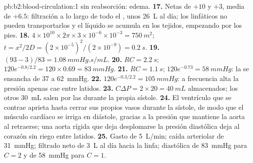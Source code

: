 \begin{solution}{pb:b2:blood-circulation:1}
sin reabsorción: edema.
\textbf{17.} Netas de $+10$ y $+3$, media de $+6.5$: filtración a lo largo
de todo el , unos \qty{26}{L} al día; los linfáticos no pueden
transportarlos y el líquido se acumula en los tejidos, empezando por los
pies.
\textbf{18.} $4\times 10^{10}\times 2\pi\times 3\times 10^{-6}\times
10^{-3} = \qty{750}{m^2}$; $t = x^{2}/2D = (2\times 10^{-5})^{2}/
(2\times 10^{-9}) = \qty{0.2}{s}$.
\textbf{19.} $(93 - 3)/83 = \qty{1.08}{mmHg.s/mL}$.
\textbf{20.} $RC = \qty{2.2}{s}$; $120e^{-0.8/2.2} = 120\times 0.69 =
\qty{83}{mmHg}$.
\textbf{21.} $RC = \qty{1.1}{s}$; $120e^{-0.73} = \qty{58}{mmHg}$: la
 se ensancha de 37 a \qty{62}{mmHg}.
\textbf{22.} $120e^{-0.3/2.2} = \qty{105}{mmHg}$: a frecuencia alta la
presión apenas cae entre latidos.
\textbf{23.} $C\Delta P = 2\times 20 = \qty{40}{mL}$ almacenados; los otros
\qty{30}{mL} salen por las  durante la propia sístole.
\textbf{24.} El ventrículo que se contrae aprieta hasta cerrar sus propios
vasos durante la sístole, de modo que el músculo cardíaco se irriga en
diástole, gracias a la presión que mantiene la aorta al retraerse; una
aorta rígida que deja desplomarse la presión diastólica deja al corazón
sin riego entre latidos.
\textbf{25.} Gasto de \qty{5}{L/min}; caída arteriolar de \qty{31}{mmHg};
filtrado neto de \qty{3}{L} al día hacia la linfa; diastólica de
\qty{83}{mmHg} para $C = 2$ y de \qty{58}{mmHg} para $C = 1$.
\end{solution}
